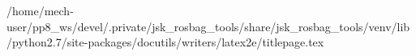/home/mech-user/pp8_ws/devel/.private/jsk_rosbag_tools/share/jsk_rosbag_tools/venv/lib/python2.7/site-packages/docutils/writers/latex2e/titlepage.tex
